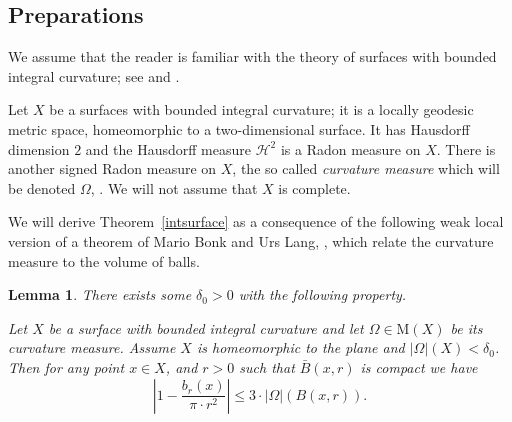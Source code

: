\documentclass[12pt,leqno,intlimits]{amsart}
\numberwithin{equation}{section}
\newtheorem{lem}[thm]{Lemma}
\theoremstyle{definition}
\theoremstyle{remark}
\newcommand{\tref}[1]{Theorem~\ref{#1}}
\begin{document}
\subsection{Preparations}
We assume that the reader is familiar with the theory of surfaces with bounded integral curvature; see \cite{AZ} and \cite{Reshetnyak-GeomIV}.

Let $X$ be a surfaces with bounded integral curvature;
it is a locally geodesic metric space, homeomorphic to a two-dimensional surface.
It has Hausdorff dimension $2$ and the Hausdorff measure $\mathcal H^2$ is a Radon measure on $X$. There is another signed Radon measure on $X$, the so called \emph{curvature measure} which will be denoted $\Omega$, \cite[Section 8]{Reshetnyak-GeomIV}.
We will not assume that $X$ is complete.

We will derive \tref{intsurface} as a consequence of the following weak local
version of a theorem of Mario Bonk and Urs Lang, \cite{Bonk-Lang}, which relate the curvature measure to the volume of balls.

{\color{red}

\begin{lem} \label{lem:bl}
There exists some $\delta _0>0$ with the following property.

Let $X$ be a surface with bounded integral curvature and let $\Omega\in \mathrm M(X)$ be its curvature measure.
Assume $X$ is homeomorphic to the plane and $| \Omega|(X) < \delta _0$.
Then for any point $x\in X$, and $r>0$ such that
$\bar B (x,{r})$ is compact we have
$$\left|1- \frac {b_r(x)} {\pi{\cdot}r^2} \right| \leq 3 \cdot |\Omega |( B (x,{r})).$$
\end{lem}

}
\end{document}
